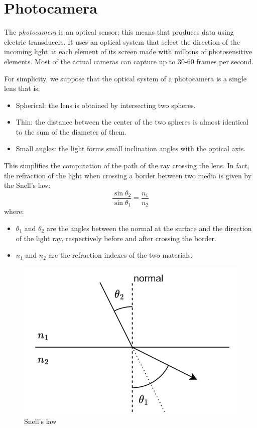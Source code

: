 \documentclass[12pt, a4paper]{report}
\newtheorem[style=M,bodystyle=\normalfont]{theorem}{Theorem}
\newtheorem[style=M,bodystyle=\normalfont]{corollary}{Corollary}
\newtheorem[style=M,bodystyle=\normalfont]{lemma}{Lemma}
\newtheorem[style=M,bodystyle=\normalfont]{definition}{Definition}
\begin{document}
    \section{Photocamera}
    \begin{definition}
    The \emph{photocamera} is an optical sensor; this means that produces data using electric transducers. It uses an optical system that select the direction of the incoming light at each 
    element of its screen made with millions of photosensitive elements. Most of the actual cameras can capture up to 30-60 frames per second. 
    \end{definition}
    For simplicity, we suppose that the optical system of a photocamera is a single lens that is:
    \begin{itemize}
        \item Spherical: the lens is obtained by intersecting two spheres. 
        \item Thin: the distance between the center of the two spheres is almost identical to the sum of the diameter of them. 
        \item Small angles: the light forms small inclination angles with the optical axis.
    \end{itemize}
    This simplifies the computation of the path of the ray crossing the lens. In fact, the refraction of the light when crossing a border between two media is given by the Snell's law: 
    \[\dfrac{\sin{\theta_2}}{\sin{\theta_1}}=\dfrac{n_1}{n_2}\]
    where: 
    \begin{itemize}
        \item $\theta_1$ and $\theta_2$ are the angles between the normal at the surface and the direction of the light ray, respectively before and after crossing the border. 
        \item $n_1$ and $n_2$ are the refraction indexes of the two materials.
    \end{itemize}
    \begin{figure}[H]
        \centering
        \includegraphics[width=0.5\linewidth]{images/refraction.png}
        \caption{Snell's law}
    \end{figure}
\end{document}
